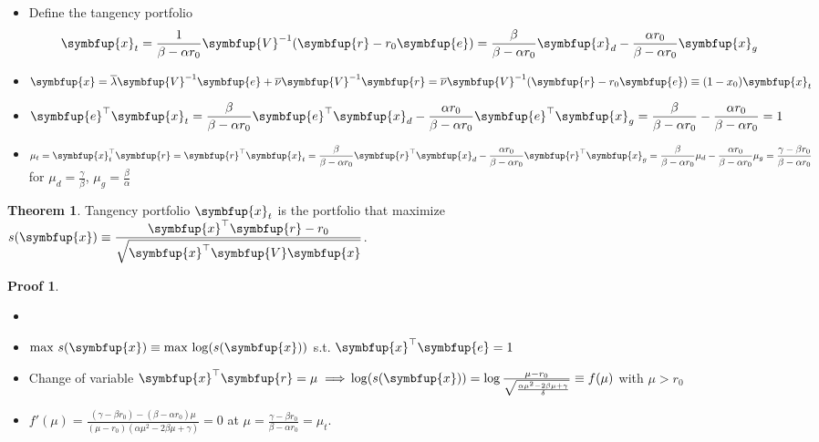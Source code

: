 \documentclass[11pt]{extarticle}
\newcommand{\ds}{\displaystyle}
\newcommand{\ie}{\;\Longrightarrow\;}
\newcommand{\vx}{\symbfup{x}}
\newcommand{\vbb}{\symbfup{\beta}}
\newcommand{\vR}{\symbfup{R}}
\newcommand{\vV}{\symbfup{V}}
\newcommand{\ve}{\symbfup{e}}
\newcommand{\vr}{\symbfup{r}}
\DeclareMathOperator\var{var}
\DeclareMathOperator\cov{cov}
\DeclareMathOperator\cor{cor}
\theoremstyle{definition}
\newtheorem*{thm}{Theorem}
\newtheorem*{prf}{Proof}
\begin{document}
\begin{itemize}\setlength\itemsep{0em}
  \item Define the tangency portfolio 
    \begin{align*}
      \ds\vx_t = \frac{1}{\beta-\alpha r_0}\vV^{-1}(\vr - r_0\ve) = \frac{\beta}{\beta - \alpha r_0}\vx_d - \frac{\alpha r_0}{\beta - \alpha r_0}\vx_g
    \end{align*}
  \item $\ds\vx = \overline{\lambda}\vV^{-1}\ve + \overline{\nu}\vV^{-1}\vr = \overline{\nu}\vV^{-1}(\vr - r_0\ve)\equiv(1 - x_0)\vx_t$
  \item $\ds\ve^\top\vx_t = \frac{\beta}{\beta - \alpha r_0}\ve^\top\vx_d - \frac{\alpha r_0}{\beta - \alpha r_0}\ve^\top\vx_g = \frac{\beta}{\beta - \alpha r_0} - \frac{\alpha r_0}{\beta - \alpha r_0} = 1$
  \item $\ds\mu_t = \vx^\top_t\vr = \vr^\top\vx_t = \frac{\beta}{\beta - \alpha r_0}\vr^\top\vx_d - \frac{\alpha r_0}{\beta - \alpha r_0}\vr^\top\vx_g \\ = \frac{\beta}{\beta - \alpha r_0}\mu_d - \frac{\alpha r_0}{\beta - \alpha r_0}\mu_g = \frac{\gamma - \beta r_0}{\beta - \alpha r_0}$ for $\ds\mu_d = \frac{\gamma}{\beta}$, $\ds\mu_g = \frac{\beta}{\alpha}$
\end{itemize}

\begin{thm}
  Tangency portfolio $\vx_t$ is the portfolio that maximize \\$\ds s(\vx)\equiv\frac{\vx^\top\vr - r_0}{\sqrt{\vx^\top\vV\vx}}$.
\end{thm}

\begin{prf}
  \begin{itemize}
    \item[]
    \item $\ds\max\,s(\vx)\equiv\max\,\log(s(\vx))$ s.t. $\ds\vx^\top\ve = 1$ 
    \item Change of variable $\vx^\top\vr = \mu\ie \\ \log(s(\vx)) = \log\frac{\mu - r_0}{\sqrt{\frac{\alpha\mu^2 - 2\beta\mu + \gamma}{\delta}}}\equiv f(\mu)$ with $\mu > r_0$
    \item $\ds f'(\mu) = \frac{(\gamma - \beta r_0) - (\beta - \alpha r_0)\mu}{(\mu - r_0)\left(\alpha\mu^2 - 2\beta\mu + \gamma\right)} = 0$ at $\ds\mu = \frac{\gamma - \beta r_0}{\beta - \alpha r_0} = \mu_t$.
  \end{itemize}
\end{prf}




\end{document}
